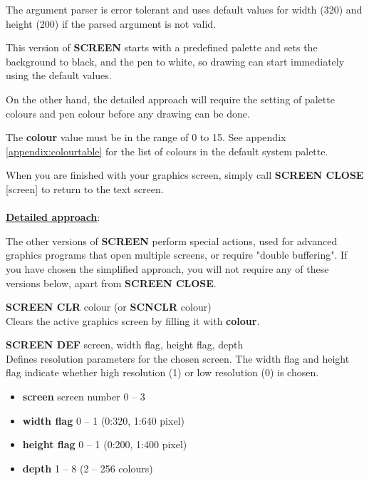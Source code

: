\begin{description}[leftmargin=2cm,style=nextline]
               The argument parser is error tolerant and uses default values
               for width (320) and height (200)
               if the parsed argument is not valid.

               This version of {\bf SCREEN} starts with a predefined
               palette and sets the background to black, and the pen to white,
               so drawing can start immediately using the default values.

               On the other hand, the detailed approach
               will require the setting of palette colours and pen colour
               before any drawing can be done.

               The {\bf colour} value must be in the range of 0 to 15.
               See appendix \vref{appendix:colourtable}
               for the list of colours in the default system palette.

               When you are finished with your graphics screen, simply call
               {\bf SCREEN CLOSE} [screen] to return to the text screen.
\\
\\
        \underline{{\bf Detailed approach}}:

               The other versions of
               {\bf SCREEN} perform special actions, used for
               advanced graphics programs that open multiple screens,
               or require "double buffering". If you have chosen the simplified
               approach, you will not require any of these versions below,
               apart from {\bf SCREEN CLOSE}.

                {\bf SCREEN CLR} colour (or {\bf SCNCLR} colour) \\
                Clears the active graphics screen by filling it with {\bf colour}.

                {\bf SCREEN DEF} screen, width flag, height flag, depth \\
                Defines resolution parameters for the chosen
                screen. The width flag and height flag indicate
                whether high resolution (1) or low resolution (0) is chosen.

                \begin{itemize}
                  \item {\bf screen} screen number 0 -- 3
                  \item {\bf width flag} 0 -- 1 (0:320, 1:640 pixel)
                  \item {\bf height flag} 0 -- 1 (0:200, 1:400 pixel)
                  \item {\bf depth} 1 -- 8 (2 -- 256 colours)
                \end{itemize}


\end{description}
